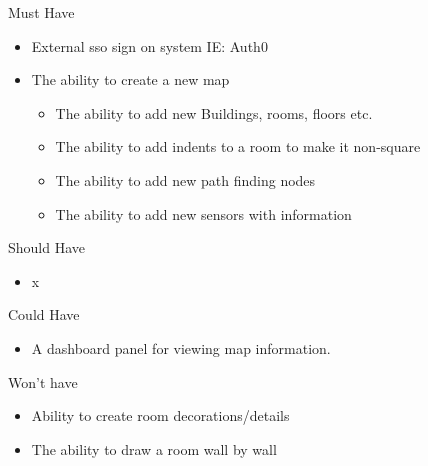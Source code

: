 Must Have
\begin{itemize}
	\item External sso sign on system IE: Auth0
	\item The ability to create a new map
	\begin{itemize}
		\item The ability to add new Buildings, rooms, floors etc.
		\item The ability to add indents to a room to make it non-square
		\item The ability to add new path finding nodes
		\item The ability to add new sensors with information		
	\end{itemize}
	
\end{itemize}
Should Have
\begin{itemize}
	\item x
\end{itemize}
Could Have
\begin{itemize}
	\item A dashboard panel for viewing map information.
\end{itemize}
Won't have
\begin{itemize}
	\item Ability to create room decorations/details
	\item The ability to draw a room wall by wall
\end{itemize}
